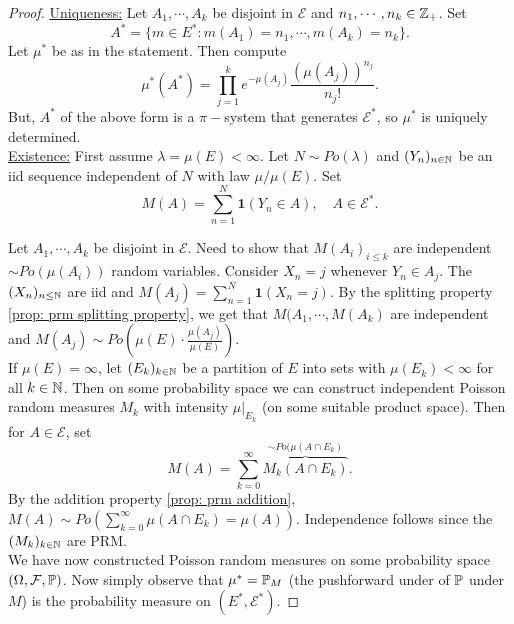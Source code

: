 \documentclass{article}
\begin{document}
\begin{proof}
	\underline{Uniqueness:} Let $ A_{1}, \cdots, A_{k}$ be disjoint in $ \mathcal{E}$ and $ n_{1}, \cdots, n_{k}\in \mathbb{Z}_{+}$. Set 
	\[
		A^{*} = \{m\in E^{*}: m(A_{1}) = n_{1}, \cdots, m(A_{k}) = n_{k}\}.
	\]
	Let $ \mu^{*}$ be as in the statement. Then compute 
	\[
		\mu^{*}(A^{*}) = \displaystyle \prod^{k}_{j=1}e^{-\mu(A_{j})}\frac{(\mu(A_{j}))^{n_{j}}}{n_{j}!}.
	\]
	But, $ A^{*}$ of the above form is a $ \pi-$system that generates $ \mathcal{E}^{*}$, so $ \mu^{*}$ is uniquely determined. \\

\underline{Existence:} First assume $ \lambda = \mu(E)<\infty$. Let $ N\sim Po(\lambda)$ and $ (Y_{n})_{n\in \mathbb{N}}$ be an iid sequence independent of $ N$ with law $ \mu/\mu(E)$. Set 
\[
	M(A) =\displaystyle\sum^{N}_{n=1} \mathbf{1}(Y_{n}\in A) , \quad A\in \mathcal{E}^{*}.
\]

Let $ A_{1},\cdots,  A_{k}$ be disjoint in $ \mathcal{E}$. Need to show that $ M(A_{i})_{i\leq k}$ are independent $ \sim Po(\mu(A_{i}))$ random variables. Consider $ X_{n}=j$ whenever $ Y_{n}\in A_{j}$. The $ (X_{n})_{n\leq \mathbb{N}}$ are iid and $ M(A_{j}) =\displaystyle\sum^{N}_{n=1} \mathbf{1}(X_{n}=j) $. By the splitting property \ref{prop: prm splitting property}, we get that $ M(A_{1}, \cdots, M(A_{k})$ are independent and $ M(A_{j})\sim Po \left( \mu(E) \cdot \frac{\mu(A_{j})}{\mu(E)} \right)$.\\ 

If $\mu(E) = \infty$, let $ (E_{k})_{k\in \mathbb{N}}$ be a partition of $ E$ into sets with $ \mu(E_{k})<\infty$ for all $ k\in \mathbb{N}$. Then on some probability space we can construct independent Poisson random measures $ M_{k}$ with intensity $ \mu |_{E_{k}}$ (on some suitable product space). Then for $ A\in \mathcal{E}$, set 
\[
	M(A) =\displaystyle\sum^{\infty}_{k=0}\overbrace{M_{k}(A\cap E_{k})}^{\sim Po(\mu(A\cap E_{k})}. 
\]
By the addition property \ref{prop: prm addition}, $ M(A) \sim Po \left(\displaystyle\sum^{\infty}_{k=0} \mu(A\cap E_{k}) = \mu(A)  \right)$. Independence follows since the $(M_{k})_{k\in \mathbb{N}}$ are PRM. \\ 

We have now constructed Poisson random measures on some probability space $ (\Omega, \mathcal{F}, \mathbb{P})$. Now simply observe that $ \mu^{*}=\mathbb{P}_{M}$ (the pushforward under of $ \mathbb{P}$ under $ M$) is the probability measure on $ (E^{*}, \mathcal{E}^{*})$.

\end{proof}
\end{document}

